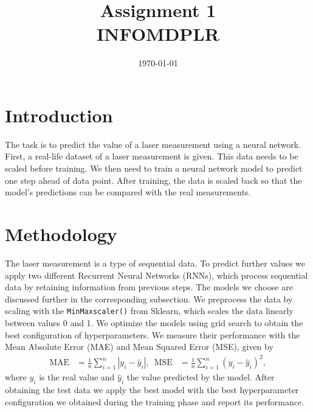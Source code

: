 \documentclass[conference]{IEEEtran}
\begin{document}
\title{Assignment 1\\INFOMDPLR}
\author{
	\and
	\and
	\and
}
\date{\today}
\maketitle

\section{Introduction}
The task is to predict the value of a laser measurement using a neural network.
First, a real-life dataset of a laser measurement is given.
This data needs to be scaled before training.
We then need to train a neural network model to predict one step ahead of data point.
After training, the data is scaled back so that the model's predictions can be compared with the real measurements.


\section{Methodology}
The laser measurement is a type of sequential data. To predict further values we apply two different Recurrent Neural Networks (RNNs), which process sequential data by retaining information from previous steps. The models we choose are discussed further in the corresponding subsection. We preprocess the data by scaling with the \texttt{MinMaxscaler()} from Sklearn, which scales the data linearly between values 0 and 1. We optimize the models using grid search to obtain the best configuration of hyperparameters. We measure their performance with the Mean Absolute Error (MAE) and Mean Squared Error (MSE), given by
\begin{align}
	\mathrm{MAE} & = \frac{1}{n} \sum_{i=1}^{n} | y_i - \hat{y}_i |, \,\,\, \mathrm{MSE} & = \frac{1}{n} \sum_{i=1}^{n} (y_i - \hat{y}_i)^2,
\end{align}
where $y_i$ is the real value and $\hat{y}_i$ the value predicted by the model. After obtaining the test data we apply the best model with the best hyperparameter configuration we obtained during the training phase and report its performance.
\end{document}
